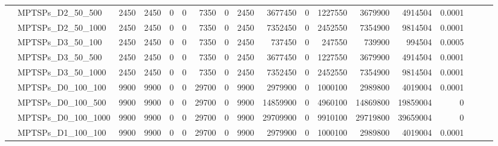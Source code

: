 \begin{table}[h]
{\begin{tabular}{llrrrrrrrrrrrrrlll}
			& MPTSPs\_D2\_50\_500          & 2450         & 2450        & 0          & 0            & 7350        & 0          & 2450    & 3677450  & 0      & 1227550 & 3679900  & 4914504    & 0.0001    &                          &                          &                          \\
			& MPTSPs\_D2\_50\_1000         & 2450         & 2450        & 0          & 0            & 7350        & 0          & 2450    & 7352450  & 0      & 2452550 & 7354900  & 9814504    & 0.0001    &                          &                          &                          \\
			& MPTSPs\_D3\_50\_100          & 2450         & 2450        & 0          & 0            & 7350        & 0          & 2450    & 737450   & 0      & 247550  & 739900   & 994504     & 0.0005    &                          &                          &                          \\
			& MPTSPs\_D3\_50\_500          & 2450         & 2450        & 0          & 0            & 7350        & 0          & 2450    & 3677450  & 0      & 1227550 & 3679900  & 4914504    & 0.0001    &                          &                          &                          \\
			& MPTSPs\_D3\_50\_1000         & 2450         & 2450        & 0          & 0            & 7350        & 0          & 2450    & 7352450  & 0      & 2452550 & 7354900  & 9814504    & 0.0001    &                          &                          &                          \\
			& MPTSPs\_D0\_100\_100         & 9900         & 9900        & 0          & 0            & 29700       & 0          & 9900    & 2979900  & 0      & 1000100 & 2989800  & 4019004    & 0.0001    &                          &                          &                          \\
			& MPTSPs\_D0\_100\_500         & 9900         & 9900        & 0          & 0            & 29700       & 0          & 9900    & 14859900 & 0      & 4960100 & 14869800 & 19859004   & 0         &                          &                          &                          \\
			& MPTSPs\_D0\_100\_1000        & 9900         & 9900        & 0          & 0            & 29700       & 0          & 9900    & 29709900 & 0      & 9910100 & 29719800 & 39659004   & 0         &                          &                          &                          \\
			& MPTSPs\_D1\_100\_100         & 9900         & 9900        & 0          & 0            & 29700       & 0          & 9900    & 2979900  & 0      & 1000100 & 2989800  & 4019004    & 0.0001    &                          &                          &                          \\

\end{tabular}}
\end{table}
